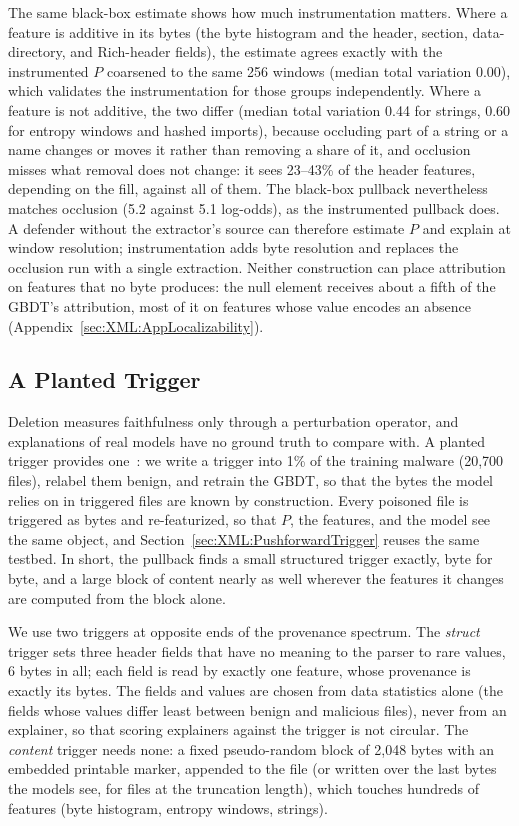The same black-box estimate shows how much instrumentation matters. Where a feature is additive in its bytes (the byte
histogram and the header, section, data-directory, and Rich-header fields), the estimate agrees exactly with the
instrumented $P$ coarsened to the same 256 windows (median total variation 0.00), which validates the instrumentation
for those groups independently. Where a feature is not additive, the two differ (median total variation 0.44 for
strings, 0.60 for entropy windows and hashed imports), because occluding part of a string or a name changes or moves
it rather than removing a share of it, and occlusion misses what removal does not change: it sees 23--43\% of the
header features, depending on the fill, against all of them. The black-box pullback nevertheless matches occlusion
(5.2 against 5.1 log-odds), as the instrumented pullback does. A defender without the extractor's source can therefore
estimate $P$ and explain at window resolution; instrumentation adds byte resolution and replaces the occlusion run with
a single extraction. Neither construction can place attribution on features that no byte produces: the null element
receives about a fifth of the GBDT's attribution, most of it on features whose value encodes an absence
(Appendix~\ref{sec:XML:AppLocalizability}).

\subsection{A Planted Trigger}
\label{sec:XML:PullbackTrigger}

Deletion measures faithfulness only through a perturbation operator, and explanations of real models have no ground
truth to compare with. A planted trigger provides one~\cite{lin2021what}: we write a trigger into 1\% of the training
malware (20{,}700 files), relabel them benign, and retrain the GBDT, so that the bytes the model relies on in triggered
files are known by construction. Every poisoned file is triggered as bytes and re-featurized, so that $P$, the
features, and the model see the same object, and Section~\ref{sec:XML:PushforwardTrigger} reuses the same testbed.
In short, the pullback finds a small structured trigger exactly, byte for byte, and a large block of content nearly as
well wherever the features it changes are computed from the block alone.

We use two triggers at opposite ends of the provenance spectrum. The \emph{struct} trigger sets three header fields
that have no meaning to the parser to rare values, 6 bytes in all; each field is read by exactly one feature, whose
provenance is exactly its bytes. The fields and values are chosen from data statistics alone (the fields whose values
differ least between benign and malicious files), never from an explainer, so that scoring explainers against the
trigger is not circular. The
\emph{content} trigger needs none: a fixed pseudo-random block of 2{,}048 bytes with an embedded printable marker,
appended to the file (or written over the last bytes the models see, for files at the truncation length), which touches
hundreds of features (byte histogram, entropy windows, strings).

